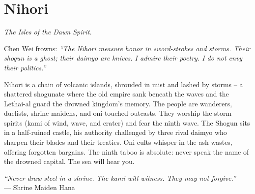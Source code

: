 \documentclass[12pt,oneside]{book}
\begin{document}
\newpage

\newpage

\chapter{Nihori}
\emph{The Isles of the Dawn Spirit.}

\noindent
Chen Wei frowns: \textit{``The Nihori measure honor in sword-strokes and storms. Their shogun is a ghost; their daimyo are knives. I admire their poetry. I do not envy their politics.''}

\noindent
Nihori is a chain of volcanic islands, shrouded in mist and lashed by storms -- a shattered shogunate where the old empire sank beneath the waves and the Lethai-al guard the drowned kingdom's memory. The people are wanderers, duelists, shrine maidens, and oni-touched outcasts. They worship the storm spirits (kami of wind, wave, and crater) and fear the ninth wave. The Shogun sits in a half-ruined castle, his authority challenged by three rival daimyo who sharpen their blades and their treaties. Oni cults whisper in the ash wastes, offering forgotten bargains. The ninth taboo is absolute: never speak the name of the drowned capital. The sea will hear you.

\vspace{0.5em}
\noindent\textit{``Never draw steel in a shrine. The kami will witness. They may not forgive.''} \\
--- Shrine Maiden Hana
\end{document}
